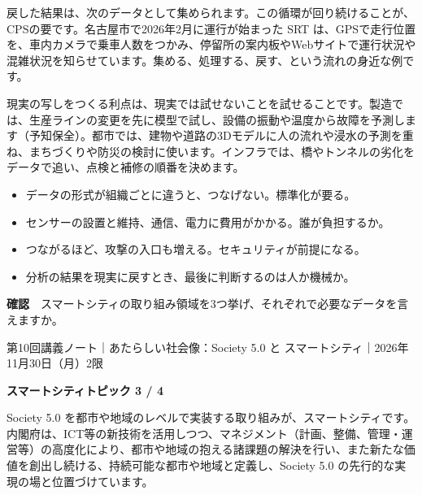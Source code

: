\documentclass[paper=a4paper,fontsize=10pt,line_length=170mm,number_of_lines=46,baselineskip=1.6zw]{jlreq}
\newcommand\topichead[4]{%
  {\sffamily\footnotesize\color{grayt}#1\par}\vspace{1.5mm}
  {\sffamily\bfseries\LARGE #4}\hfill\colorbox{accent}{\sffamily\footnotesize\bfseries トピック #2 / #3}\par
  \vspace{1.2mm}{\color{ink}\hrule height 0.6pt}\vspace{3mm}}
\newcommand\subhead[1]{\par\vspace{2.6mm}{\sffamily\bfseries\large #1}\par\vspace{1.3mm}}
\begin{document}
戻した結果は、次のデータとして集められます。この循環が回り続けることが、CPSの要です。名古屋市で2026年2月に運行が始まった SRT は、GPSで走行位置を、車内カメラで乗車人数をつかみ、停留所の案内板やWebサイトで運行状況や混雑状況を知らせています。集める、処理する、戻す、という流れの身近な例です。\par\vspace{1.2mm}
\subhead{デジタルツイン}
現実の写しをつくる利点は、現実では試せないことを試せることです。製造では、生産ラインの変更を先に模型で試し、設備の振動や温度から故障を予測します（予知保全）。都市では、建物や道路の3Dモデルに人の流れや浸水の予測を重ね、まちづくりや防災の検討に使います。インフラでは、橋やトンネルの劣化をデータで追い、点検と補修の順番を決めます。\par\vspace{1.2mm}
\subhead{技術の課題}
\begin{itemize}[leftmargin=1.5em,itemsep=0.6mm,topsep=0.3mm]
\item データの形式が組織ごとに違うと、つなげない。標準化が要る。
\item センサーの設置と維持、通信、電力に費用がかかる。誰が負担するか。
\item つながるほど、攻撃の入口も増える。セキュリティが前提になる。
\item 分析の結果を現実に戻すとき、最後に判断するのは人か機械か。
\end{itemize}\vspace{0.8mm}
\begin{checkbox}
{\sffamily\bfseries 確認}　スマートシティの取り組み領域を3つ挙げ、それぞれで必要なデータを言えますか。\par
\end{checkbox}
\clearpage
\topichead{第10回講義ノート｜あたらしい社会像：Society 5.0 と スマートシティ｜2026年11月30日（月）2限}{3}{4}{スマートシティ}
Society 5.0 を都市や地域のレベルで実装する取り組みが、スマートシティです。内閣府は、ICT等の新技術を活用しつつ、マネジメント（計画、整備、管理・運営等）の高度化により、都市や地域の抱える諸課題の解決を行い、また新たな価値を創出し続ける、持続可能な都市や地域と定義し、Society 5.0 の先行的な実現の場と位置づけています。\par\vspace{1.2mm}
\subhead{取り組み領域}
\end{document}
